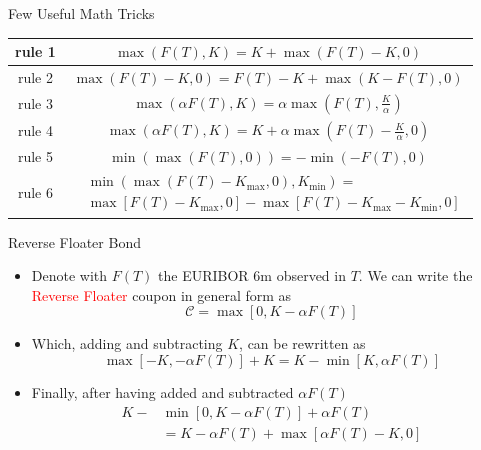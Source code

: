 \documentclass{beamer}
\begin{document}
\begin{frame}{Few Useful Math Tricks}
	\renewcommand{\arraystretch}{1.4}
	\begin{table}[bt]
		\begin{tabular}{|c|c|} \hline
			rule 1 & $\max(F(T),K) = K + \max(F(T) -K, 0)$\\ \hline		
			rule 2 & $\max(F(T)-K,0) = F(T)-K + \max(K-F(T), 0)$\\ \hline		
			rule 3 & $\max(\alpha F(T),K) = \alpha \max(F(T),\frac{K}{\alpha})$\\ \hline		
			rule 4 & $\max(\alpha F(T),K) = K + \alpha\max(F(T)-\frac{K}{\alpha}, 0)$\\ \hline		
			rule 5 & $\min(\max(F(T),0)) = -\min(-F(T),0)$\\ \hline		
			rule 6 & $\begin{aligned}&\min(\max(F(T)-K_{\max}, 0), K_{\min}) =\\ &\max[F(T)-K_{\max},0]-\max[F(T)-K_{\max}-K_{\min},0]\end{aligned}$\\ \hline		
		\end{tabular}
	\end{table}
\end{frame}


\begin{frame}{Reverse Floater Bond}
	\begin{itemize}
		\item Denote with $F(T)$ the EURIBOR 6m observed in $T$. We can write the \textcolor{red}{Reverse Floater} coupon in general form as
		\begin{equation}
			\mathcal{C}=\max[0, K-\alpha F(T)]
		\end{equation}
		\item Which, adding and subtracting $K$, can be rewritten as
		\begin{equation*}
			\max[-K,-\alpha F(T)] + K = K - \min[K,\alpha F(T)]
		\end{equation*}
		\item Finally, after having added and subtracted $\alpha F(T)$
		\begin{equation*}
			\begin{aligned}
				K-&\min[0,K-\alpha F(T)]+\alpha F(T) \\ &= K - \alpha F(T) + \max[\alpha F(T)-K,0]
			\end{aligned}
		\end{equation*}
	\end{itemize}
\end{frame}
\end{document}
